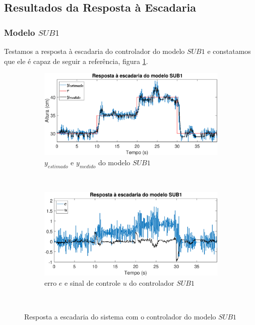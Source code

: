 \subsection{Resultados da Resposta à Escadaria}\label{rstair}

\subsubsection{Modelo $SUB1$}
Testamos a resposta à escadaria do controlador do modelo $SUB1$ e constatamos que ele é capaz de seguir a referência, figura \ref{fig:stairrsub1y}.

\begin{figure}[htb]
	\centering
	\begin{subfigure}[t]{0.48\textwidth}
		\includegraphics[width=1\linewidth]{stairrsub1y}
		\caption[$y_{estimado}$ e $y_{medido}$ do modelo $SUB1$]{$y_{estimado}$ e $y_{medido}$ do modelo $SUB1$}
		\label{fig:stairrsub1y}
	\end{subfigure}
	~ %
	\begin{subfigure}[t]{0.48\textwidth}
		\includegraphics[width=1\linewidth]{stairrsub1e}
		\caption[erro $e$ e sinal de controle $u$ do controlador $SUB1$]{erro $e$ e sinal de controle $u$ do controlador $SUB1$}
		\label{fig:stairrsub1e}
	\end{subfigure}
	~ %
	
	\caption{Resposta a escadaria do sistema com o controlador do modelo $SUB1$}\label{fig:stairrsub1}
\end{figure}

